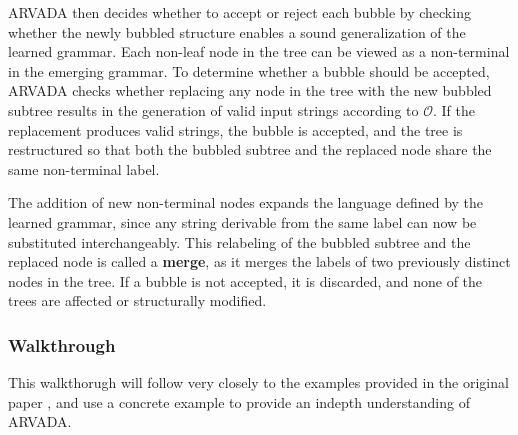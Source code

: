 \vspace{\baselineskip}
ARVADA then decides whether to accept or reject each bubble by checking whether the newly bubbled structure enables a sound generalization of the learned grammar. Each non-leaf node in the tree can be viewed as a non-terminal in the emerging grammar. To determine whether a bubble should be accepted, ARVADA checks whether replacing any node in the tree with the new bubbled subtree results in the generation of valid input strings according to $\mathcal{O}$. If the replacement produces valid strings, the bubble is accepted, and the tree is restructured so that both the bubbled subtree and the replaced node share the same non-terminal label.

\vspace{\baselineskip}
The addition of new non-terminal nodes expands the language defined by the learned grammar, since any string derivable from the same label can now be substituted interchangeably. This relabeling of the bubbled subtree and the replaced node is called a \textbf{merge}, as it merges the labels of two previously distinct nodes in the tree. If a bubble is not accepted, it is discarded, and none of the trees are affected or structurally modified.

\subsubsection{Walkthrough}

This walkthorugh will follow very closely to the examples provided in the original paper \cite{kulkarniLearningHighlyRecursive2021}, and use a concrete example to provide an indepth understanding of ARVADA.

